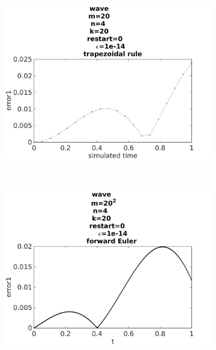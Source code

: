 \begin{figure}[H]
        \begin{subfigure}[b]{0.30\textwidth}
                \includegraphics[width=\textwidth]{../MATLAB/fig/errorovertimetrapezoidal.jpg}
                \caption{  }
                \label{fig:errortrap}
        \end{subfigure}%
        ~
        \begin{subfigure}[b]{0.30\textwidth}
                \includegraphics[width=\textwidth]{../MATLAB/fig/errorovertimeeuler.jpg}
                \caption{  }
                \label{fig:erroreul}
        \end{subfigure}
        \begin{subfigure}[b]{0.30\textwidth}

\end{subfigure}
\end{figure}
